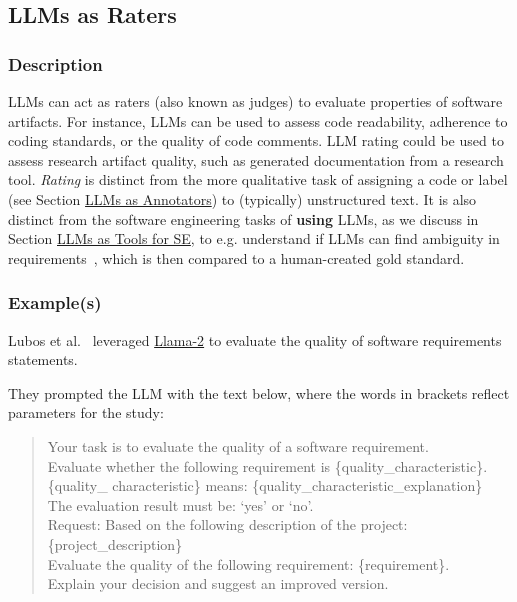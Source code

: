 \subsection{LLMs as Raters}

\subsubsection{Description}

LLMs can act as raters (also known as judges) to evaluate properties of software artifacts.%
For instance, LLMs can be used to assess code readability, adherence to coding standards, or the quality of code comments. LLM rating could be used to assess research artifact quality, such as generated documentation from a research tool.
\emph{Rating} is distinct from the more qualitative task of assigning a code or label (see Section \href{/study-types/#llms-as-annotators}{LLMs as Annotators}) to (typically) unstructured text.
It is also distinct from the software engineering tasks of \textbf{using} LLMs, as we discuss in Section \href{/study-types/#introduction-llms-as-tools-for-software-engineers}{LLMs as Tools for SE}, to e.g. understand if LLMs can find ambiguity in requirements~\cite{DBLP:conf/icse/EzziniA0S22}, which is then compared to a human-created gold standard.

\subsubsection{Example(s)}
Lubos et al.~\cite{DBLP:conf/re/LubosFTGMEL24} leveraged \href{https://www.llama.com/llama2/}{Llama-2} to evaluate the quality of software requirements statements. 

They prompted the LLM with the text below, where the words in brackets reflect parameters for the study:

\begin{quote}
Your task is to evaluate the quality of a software requirement.\\
Evaluate whether the following requirement is \{quality\_characteristic\}. \\
\{quality\_ characteristic\} means: \{quality\_characteristic\_explanation\}\\
The evaluation result must be: `yes' or `no'.\\
Request: Based on the following description of the project:
\{project\_description\}\\
Evaluate the quality of the following requirement: \{requirement\}.\\
Explain your decision and suggest an improved version.\\
\end{quote}

